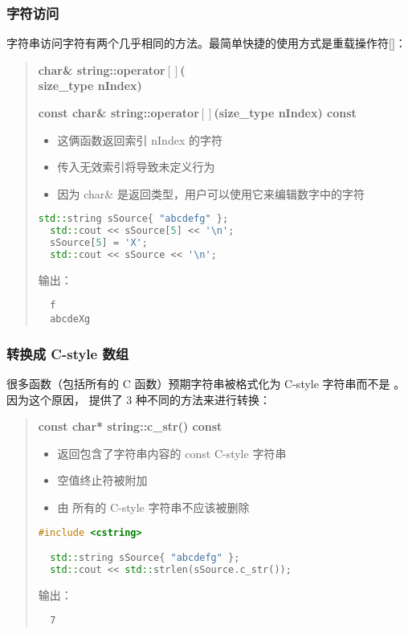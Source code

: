 \documentclass[../../LearnCpp.tex]{subfiles}
\begin{document}

\subsubsection*{字符访问}

字符串访问字符有两个几乎相同的方法。最简单快捷的使用方式是重载操作符[]：

\begin{quotation}
  \textbf{char\& string::operator$\left[\right]$( \\ size\_type nIndex)}

  \textbf{const char\& string::operator$\left[\right]$(size\_type nIndex) const}

  \begin{itemize}
    \item 这俩函数返回索引 nIndex 的字符
    \item 传入无效索引将导致未定义行为
    \item 因为 char\& 是返回类型，用户可以使用它来编辑数字中的字符
  \end{itemize}

  \begin{lstlisting}[language=C++]
  std::string sSource{ "abcdefg" };
  std::cout << sSource[5] << '\n';
  sSource[5] = 'X';
  std::cout << sSource << '\n';
  \end{lstlisting}

  输出：

  \begin{lstlisting}
  f
  abcdeXg
  \end{lstlisting}
\end{quotation}

\subsubsection*{转换成 C-style 数组}

很多函数（包括所有的 C 函数）预期字符串被格式化为 C-style 字符串而不是 。
因为这个原因， 提供了 3 种不同的方法来进行转换：

\begin{quotation}
  \textbf{const char* string::c\_str() const}

  \begin{itemize}
    \item 返回包含了字符串内容的 const C-style 字符串
    \item 空值终止符被附加
    \item 由  所有的 C-style 字符串不应该被删除
  \end{itemize}

  \begin{lstlisting}[language=C++]
  #include <cstring>

  std::string sSource{ "abcdefg" };
  std::cout << std::strlen(sSource.c_str());
  \end{lstlisting}

  输出：

  \begin{lstlisting}
  7
  \end{lstlisting}
\end{quotation}
\end{document}

